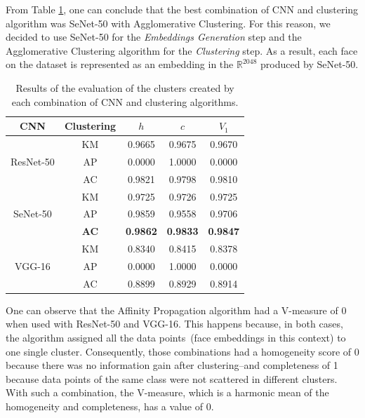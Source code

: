 From Table \ref{tab:results_clustering}, one can conclude that the best combination of CNN and clustering algorithm was SeNet-50 with Agglomerative Clustering.
For this reason, we decided to use SeNet-50 for the \emph{Embeddings Generation} step and the Agglomerative Clustering algorithm for the \emph{Clustering} step.
As a result, each face on the dataset is represented as an embedding in the $\mathbb{R}^{2048}$ produced by SeNet-50.

\begin{table}[!ht]
\centering
\small
\caption{Results of the evaluation of the clusters created by each combination of CNN and clustering algorithms.}
\begin{tabular}{@{}ccccc@{}}
\toprule
\textbf{CNN} & \textbf{Clustering} & \textbf{$h$} & \textbf{$c$} & \textbf{$V_1$} \\ \midrule
                  & KM                  & 0.9665                     & 0.9675                      & 0.9670             \\
ResNet-50         & AP                  & 0.0000                     & 1.0000                      & 0.0000             \\
                  & AC                  & 0.9821                     & 0.9798                      & 0.9810             \\ \midrule
                  & KM                  & 0.9725                     & 0.9726                      & 0.9725             \\
SeNet-50          & AP                  & 0.9859                     & 0.9558                      & 0.9706             \\
                  & \textbf{AC}         & \textbf{0.9862}            & \textbf{0.9833}             & \textbf{0.9847}    \\ \midrule
                  & KM                  & 0.8340                     & 0.8415                      & 0.8378             \\
VGG-16            & AP                  & 0.0000                     & 1.0000                      & 0.0000             \\
                  & AC                  & 0.8899                     & 0.8929                      & 0.8914             \\
\end{tabular}
\label{tab:results_clustering}
\end{table}

One can observe that the Affinity Propagation algorithm had a V-measure of $0$ when used with ResNet-50 and VGG-16. 
This happens because, in both cases, the algorithm assigned all the data points~(face embeddings in this context) to one single cluster. 
Consequently, those combinations had a homogeneity score of $0$ because there was no information gain after clustering--and completeness of 1 because data points of the same class were not scattered in different clusters.
With such a combination, the V-measure, which is a harmonic mean of the homogeneity and completeness, has a value of $0$.


